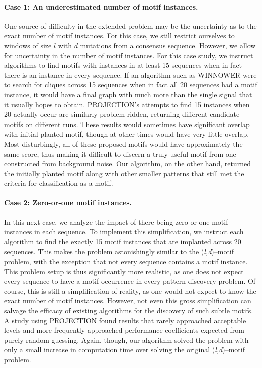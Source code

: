     \paragraph{Case 1: An underestimated number of motif instances.}
    One source of difficulty in the extended problem may be
    the uncertainty as to the exact number of motif instances.  For this
    case, we still restrict ourselves to windows of size $l$ with $d$ mutations
    from a consensus sequence.  However, we allow for uncertainty in the number
    of motif instances.
    For
    this case study, we instruct algorithms to find motifs with instances in at
    least 15 sequences when in fact there is an instance in every sequence.  If
    an algorithm such as WINNOWER were to search for cliques across 15 sequences
    when in fact all 20 sequences had a motif instance, it would have a
    final graph with much more than the single signal that it usually hopes to
    obtain.  PROJECTION's attempts to find 15
    instances when 20 actually occur are similarly problem-ridden, returning
    different candidate motifs on different runs.  These results would sometimes have
    significant overlap with initial planted motif, though at other times would
    have very little overlap.  Most disturbingly, all of these proposed motifs
    would have approximately the same score, thus making it difficult to discern
    a truly useful motif from one constructed from background noise.  Our algorithm,
    on the other hand, returned the initially planted motif along with other smaller
    patterns that still met the criteria for classification as a motif.

    \paragraph{Case 2: Zero-or-one motif instances.}
    In this next case, we analyze the impact of there being zero or one motif
    instances in each sequence.  To implement this simplification, we instruct
    each algorithm to find the exactly 15 motif instances that are implanted across 20
    sequences.  This makes the problem astonishingly similar to the
    (\textit{l,d})--motif problem, with the exception that not every sequence
    contains a motif instance.  This problem setup is thus significantly more
    realistic, as one does not expect every sequence to have a motif occurrence
    in every pattern discovery problem.  Of course, this is still a simplification
    of reality, as one would not expect to know the exact number of motif
    instances.  However, not even this
    gross simplification can salvage the efficacy of existing algorithms for
    the discovery of such subtle motifs.  A
    study using PROJECTION found results that rarely approached acceptable levels and
    more frequently approached performance coefficients
    expected from purely random guessing.  Again, though, our algorithm solved
    the problem with only a small increase in computation time over solving the
    original (\textit{l,d})--motif problem.

